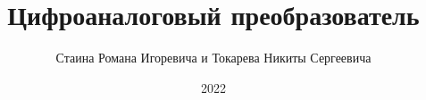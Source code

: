 \documentclass[spec, och, labwork]{shiza}
\begin{document}
\chair{}

\title{Цифроаналоговый преобразователь}






\author{Стаина Романа Игоревича и Токарева Никиты Сергеевича}








\date{2022}

\maketitle

\end{document}
